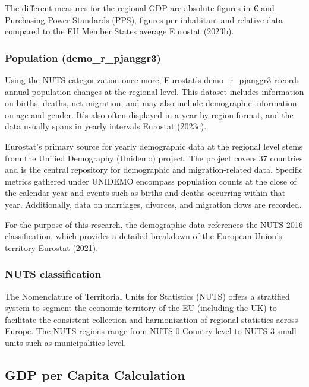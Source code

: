 \documentclass[
  a4paper,
  DIV=11,
  numbers=noendperiod]{scrartcl}
\begin{document}
The different measures for the regional GDP are absolute figures in €
and Purchasing Power Standards (PPS), figures per inhabitant and
relative data compared to the EU Member States average Eurostat (2023b).

\hypertarget{population-demo_r_pjanggr3}{%
\subsubsection{Population
(demo\_r\_pjanggr3)}\label{population-demo_r_pjanggr3}}

Using the NUTS categorization once more, Eurostat's demo\_r\_pjanggr3
records annual population changes at the regional level. This dataset
includes information on births, deaths, net migration, and may also
include demographic information on age and gender. It's also often
displayed in a year-by-region format, and the data usually spans in
yearly intervals Eurostat (2023c).

Eurostat's primary source for yearly demographic data at the regional
level stems from the Unified Demography (Unidemo) project. The project
covers 37 countries and is the central repository for demographic and
migration-related data. Specific metrics gathered under UNIDEMO
encompass population counts at the close of the calendar year and events
such as births and deaths occurring within that year. Additionally, data
on marriages, divorces, and migration flows are recorded.

For the purpose of this research, the demographic data references the
NUTS 2016 classification, which provides a detailed breakdown of the
European Union's territory Eurostat (2021).

\hypertarget{nuts-classification}{%
\subsubsection{NUTS classification}\label{nuts-classification}}

The Nomenclature of Territorial Units for Statistics (NUTS) offers a
stratified system to segment the economic territory of the EU (including
the UK) to facilitate the consistent collection and harmonization of
regional statistics across Europe. The NUTS regions range from NUTS 0
Country level to NUTS 3 small units such as municipalities level. ~

\hypertarget{gdp-per-capita-calculation}{%
\subsection{GDP per Capita
Calculation}\label{gdp-per-capita-calculation}}
\end{document}
